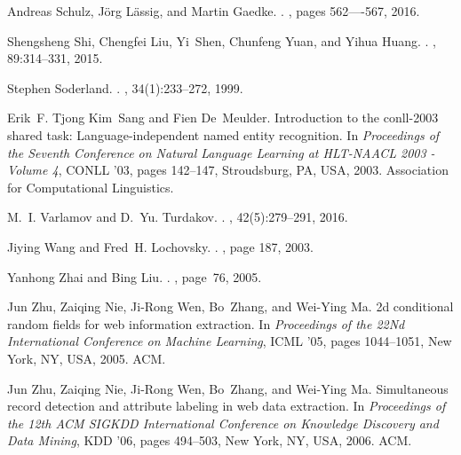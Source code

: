 \documentclass{nle}
\begin{document}
\begin{thebibliography}{}
Andreas Schulz, J{\"{o}}rg L{\"{a}}ssig, and Martin Gaedke.
.
, pages 562----567, 2016.

Shengsheng Shi, Chengfei Liu, Yi~Shen, Chunfeng Yuan, and Yihua Huang.
.
, 89:314--331, 2015.

Stephen Soderland.
.
, 34(1):233--272, 1999.

Erik~F. Tjong Kim~Sang and Fien De~Meulder.
\newblock Introduction to the conll-2003 shared task: Language-independent
  named entity recognition.
\newblock In {\em Proceedings of the Seventh Conference on Natural Language
  Learning at HLT-NAACL 2003 - Volume 4}, CONLL '03, pages 142--147,
  Stroudsburg, PA, USA, 2003. Association for Computational Linguistics.

M.~I. Varlamov and D.~Yu. Turdakov.
.
, 42(5):279--291, 2016.

Jiying Wang and Fred~H. Lochovsky.
.
, page 187, 2003.

Yanhong Zhai and Bing Liu.
.
, page~76, 2005.

Jun Zhu, Zaiqing Nie, Ji-Rong Wen, Bo~Zhang, and Wei-Ying Ma.
\newblock 2d conditional random fields for web information extraction.
\newblock In {\em Proceedings of the 22Nd International Conference on Machine
  Learning}, ICML '05, pages 1044--1051, New York, NY, USA, 2005. ACM.

Jun Zhu, Zaiqing Nie, Ji-Rong Wen, Bo~Zhang, and Wei-Ying Ma.
\newblock Simultaneous record detection and attribute labeling in web data
  extraction.
\newblock In {\em Proceedings of the 12th ACM SIGKDD International Conference
  on Knowledge Discovery and Data Mining}, KDD '06, pages 494--503, New York,
  NY, USA, 2006. ACM.
\end{thebibliography}
\end{document}
